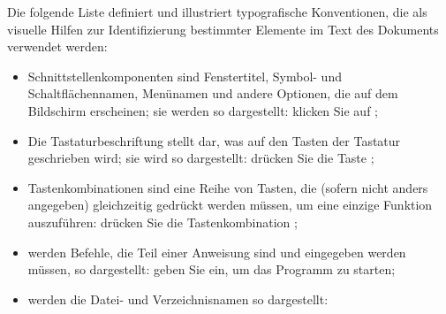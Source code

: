 {%
Die folgende Liste definiert und illustriert typografische Konventionen, die als visuelle Hilfen zur Identifizierung bestimmter Elemente im Text des Dokuments verwendet werden:

\begin{itemize}
	\item Schnittstellenkomponenten sind Fenstertitel, Symbol- und Schaltflächennamen, Menünamen und andere Optionen, die auf dem Bildschirm erscheinen; sie werden so dargestellt:%
		\newline
		\hspace*{1.5cm}klicken Sie auf ;%
	\item Die Tastaturbeschriftung stellt dar, was auf den Tasten der Tastatur geschrieben wird; sie wird so dargestellt:%
		\newline
		\hspace*{1.5cm}drücken Sie die Taste ;%
	\item Tastenkombinationen sind eine Reihe von Tasten, die (sofern nicht anders angegeben) gleichzeitig gedrückt werden müssen, um eine einzige Funktion auszuführen:%
		\newline
		\hspace*{1.5cm}drücken Sie die Tastenkombination ;%
	\item werden Befehle, die Teil einer Anweisung sind und eingegeben werden müssen, so dargestellt:%
		\newline
		\hspace*{1.5cm}geben Sie  ein, um das Programm zu starten;%
	\item werden die Datei- und Verzeichnisnamen so dargestellt:%

\end{itemize}}

